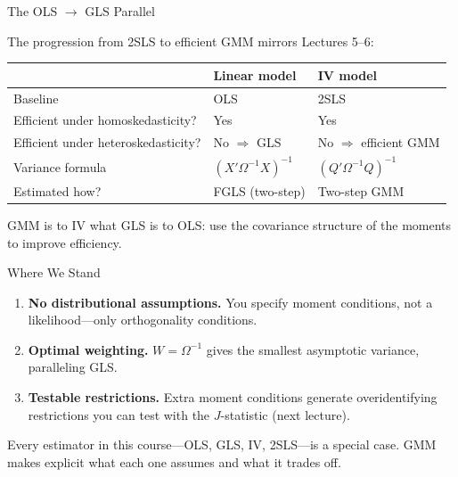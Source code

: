 \documentclass[aspectratio=169, handout, t]{beamer}
\numberwithin{equation}{section}
\begin{document}
\begin{frame}{The OLS $\to$ GLS Parallel}

The progression from 2SLS to efficient GMM mirrors Lectures 5--6:

\smallskip
\renewcommand{\arraystretch}{1.4}
\begin{tabular}{lll}
\toprule
& \textbf{Linear model} & \textbf{IV model} \\
\midrule
Baseline & OLS & 2SLS \\
Efficient under homoskedasticity? & Yes & Yes \\
Efficient under heteroskedasticity? & No $\Rightarrow$ GLS & No $\Rightarrow$ efficient GMM \\
Variance formula & $(X'\Omega^{-1}X)^{-1}$ & $(Q'\Omega^{-1}Q)^{-1}$ \\
Estimated how? & FGLS (two-step) & Two-step GMM \\
\bottomrule
\end{tabular}
\renewcommand{\arraystretch}{1.0}

\medskip\pause
GMM is to IV what GLS is to OLS: use the covariance structure of the moments to improve efficiency.

\end{frame}

\begin{frame}{Where We Stand}

\begin{tcolorbox}[colback=blue!5, colframe=blue!50, title=What GMM Buys You]
\begin{enumerate}\itemsep=1pt
\item \textbf{No distributional assumptions.}  You specify moment conditions, not a likelihood---only orthogonality conditions.
\item \textbf{Optimal weighting.}  $W = \Omega^{-1}$ gives the smallest asymptotic variance, paralleling GLS.
\item \textbf{Testable restrictions.}  Extra moment conditions generate overidentifying restrictions you can test with the $J$-statistic (next lecture).
\end{enumerate}
\end{tcolorbox}

Every estimator in this course---OLS, GLS, IV, 2SLS---is a special case.  GMM makes explicit what each one assumes and what it trades off.

\end{frame}
\end{document}
